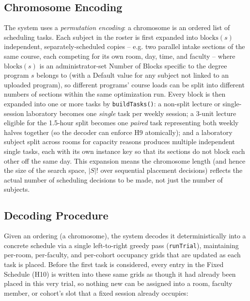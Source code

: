 \documentclass[conference]{IEEEtran}
\begin{document}
\subsection{Chromosome Encoding}
The system uses a \emph{permutation encoding}: a chromosome is an ordered list of scheduling tasks. Each subject in the roster is first expanded into $\text{blocks}(s)$ independent, separately-scheduled copies -- e.g. two parallel intake sections of the same course, each competing for its own room, day, time, and faculty -- where $\text{blocks}(s)$ is an administrator-set Number of Blocks specific to the degree program $s$ belongs to (with a Default value for any subject not linked to an uploaded program), so different programs' course loads can be split into different numbers of sections within the same optimization run. Every block is then expanded into one or more tasks by \texttt{buildTasks()}: a non-split lecture or single-session laboratory becomes one \emph{single} task per weekly session; a 3-unit lecture eligible for the 1.5-hour split becomes one \emph{paired} task representing both weekly halves together (so the decoder can enforce H9 atomically); and a laboratory subject split across rooms for capacity reasons produces multiple independent single tasks, each with its own instance key so that its sections do not block each other off the same day. This expansion means the chromosome length (and hence the size of the search space, $|S|!$ over sequential placement decisions) reflects the actual number of scheduling decisions to be made, not just the number of subjects.

\subsection{Decoding Procedure}
Given an ordering (a chromosome), the system decodes it deterministically into a concrete schedule via a single left-to-right greedy pass (\texttt{runTrial}), maintaining per-room, per-faculty, and per-cohort occupancy grids that are updated as each task is placed. Before the first task is considered, every entry in the Fixed Schedule (H10) is written into these same grids as though it had already been placed in this very trial, so nothing new can be assigned into a room, faculty member, or cohort's slot that a fixed session already occupies:
\end{document}
